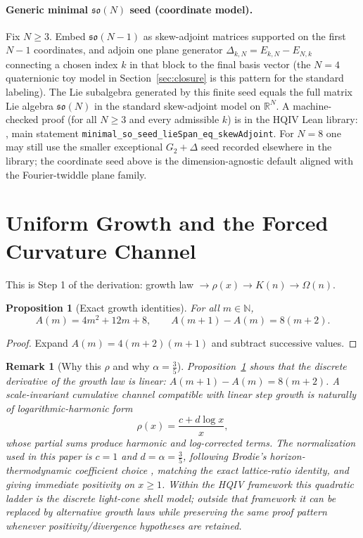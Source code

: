 \documentclass[11pt]{amsart}
\newtheorem{proposition}[theorem]{Proposition}
\newtheorem{remark}[theorem]{Remark}
\begin{document}
\paragraph{Generic minimal \(\mathfrak{so}(N)\) seed (coordinate model).}\label{para:minimal-so-seed}
Fix \(N\ge 3\). Embed \(\mathfrak{so}(N-1)\) as skew-adjoint matrices supported on the first \(N-1\) coordinates, and adjoin one plane generator \(\Delta_{k,N}=E_{k,N}-E_{N,k}\) connecting a chosen index \(k\) in that block to the final basis vector (the \(N=4\) quaternionic toy model in Section~\ref{sec:closure} is this pattern for the standard labeling). The Lie subalgebra generated by this finite seed equals the full matrix Lie algebra \(\mathfrak{so}(N)\) in the standard skew-adjoint model on \(\mathbb{R}^N\). A machine-checked proof (for all \(N\ge 3\) and every admissible \(k\)) is in the HQIV Lean library: , main statement \texttt{minimal\_so\_seed\_lieSpan\_eq\_skewAdjoint}. For \(N=8\) one may still use the smaller exceptional \(G_2+\Delta\) seed recorded elsewhere in the library; the coordinate seed above is the dimension-agnostic default aligned with the Fourier-twiddle plane family.

\section{Uniform Growth and the Forced Curvature Channel}
\label{sec:growth}
This is Step 1 of the derivation: growth law \(\to \rho(x)\to K(n)\to \Omega(n)\).

\begin{proposition}[Exact growth identities]
\label{prop:growth-identities}
For all $m\in\mathbb N$,
\[
A(m)=4m^2+12m+8,\qquad A(m+1)-A(m)=8(m+2).
\]
\end{proposition}

\begin{proof}
Expand $A(m)=4(m+2)(m+1)$ and subtract successive values.
\end{proof}

\begin{remark}[Why this $\rho$ and why $\alpha=\frac35$]
\label{rem:rho-motivation}
Proposition~\ref{prop:growth-identities} shows that the discrete derivative of the growth law is linear:
$A(m+1)-A(m)=8(m+2)$. A scale-invariant cumulative channel compatible with linear step growth is naturally of logarithmic-harmonic form
\[
\rho(x)=\frac{c+d\log x}{x},
\]
whose partial sums produce harmonic and log-corrected terms. The normalization used in this paper is $c=1$ and $d=\alpha=\frac35$, following Brodie's horizon-thermodynamic coefficient choice \cite{brodie2026}, matching the exact lattice-ratio identity, and giving immediate positivity on $x\ge 1$.
Within the HQIV framework this quadratic ladder is the discrete light-cone shell model; outside that framework it can be replaced by alternative growth laws while preserving the same proof pattern whenever positivity/divergence hypotheses are retained.
\end{remark}
\end{document}
